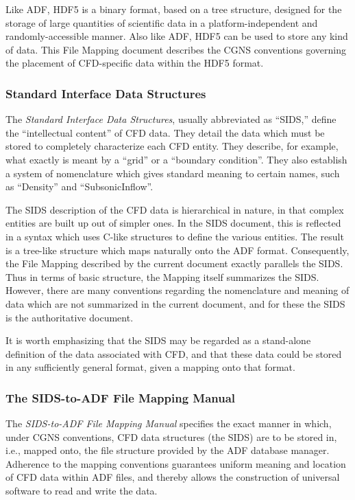 Like ADF, HDF5 is a binary format, based on a tree structure,
designed for the storage of large quantities of scientific data in a
platform-independent and randomly-accessible manner.
Also like ADF, HDF5 can be used to store any kind of data.
This File Mapping document describes the CGNS conventions governing the
placement of CFD-specific data within the HDF5 format.

\subsubsection{Standard Interface Data Structures}

The \textit{Standard Interface Data Structures}, usually abbreviated as
``SIDS,'' define the ``intellectual content'' of CFD data.
They detail the data which must be stored to completely characterize
each CFD entity. They describe, for example, what exactly is meant by a
``grid'' or a ``boundary condition''.
They also establish a system of nomenclature which gives standard
meaning to certain names, such as ``Density'' and ``SubsonicInflow''.

The SIDS description of the CFD data is hierarchical in nature, in that
complex entities are built up out of simpler ones. In the SIDS document,
this is reflected in a syntax which uses C-like structures to define
the various entities. The result is a tree-like structure which maps
naturally onto the ADF format. Consequently, the File Mapping described
by the current document exactly parallels the SIDS. Thus in terms of
basic structure, the Mapping itself summarizes the SIDS. However, there
are many conventions regarding the nomenclature and meaning of data
which are not summarized in the current document, and for these the SIDS
is the authoritative document.

It is worth emphasizing that the SIDS may be regarded as a stand-alone
definition of the data associated with CFD, and that these data could
be stored in any sufficiently general format, given a mapping onto that
format.

\subsubsection{The SIDS-to-ADF File Mapping Manual}

The \textit{SIDS-to-ADF File Mapping Manual} specifies the exact manner
in which, under CGNS conventions, CFD data structures (the SIDS) are
to be stored in, i.e., mapped onto, the file structure provided by the
ADF database manager.
Adherence to the mapping conventions guarantees uniform meaning
and location of CFD data within ADF files, and thereby allows the
construction of universal software to read and write the data.

